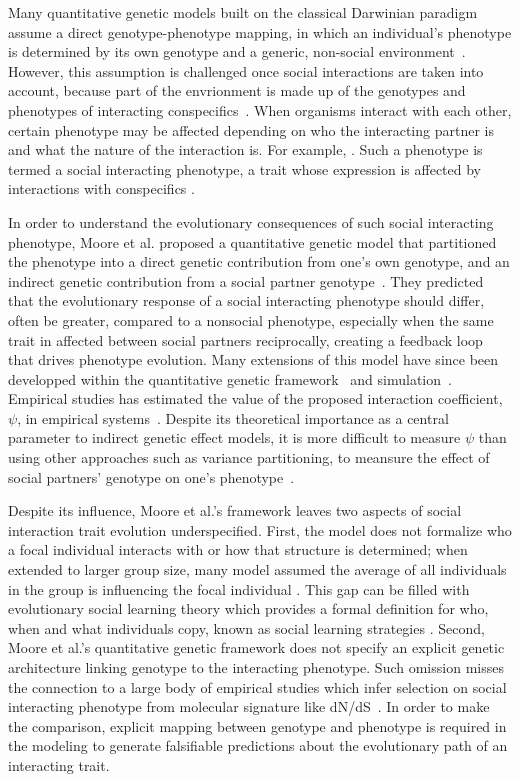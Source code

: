 \documentclass[9pt,twocolumn,twoside]{pnas-new}
\begin{document}
Many quantitative genetic models built on the classical Darwinian paradigm assume a direct genotype-phenotype mapping, in which an individual's phenotype is determined by its own genotype and a generic, non-social environment~\cite{Falconer1996}. However, this assumption is challenged once social interactions are taken into account, because part of the envrionment is made up of the genotypes and phenotypes of interacting conspecifics~\cite{Moore1997, Mousseau2009}. When organisms interact with each other, certain phenotype may be affected depending on who the interacting partner is and what the nature of the interaction is. For example, . Such a phenotype is termed a social interacting phenotype, a trait whose expression is affected by interactions with conspecifics \cite{Moore1997}.

In order to understand the evolutionary consequences of such social interacting phenotype, Moore et al. proposed a quantitative genetic model that partitioned the phenotype into a direct genetic contribution from one's own genotype, and an indirect genetic contribution from a social partner genotype~\cite{Moore1997}. They predicted that the evolutionary response of a social \Parasplit interacting phenotype should differ, often be greater, compared to a nonsocial phenotype, especially when the same trait in affected between social partners reciprocally, creating a feedback loop that drives phenotype evolution. Many extensions of this model have since been developped within the quantitative genetic framework~\cite{Wolf1999, McGlothlin2010, Bijma2008, agrawal2001, Bailey2014, Bailey2012} and simulation~\cite{Montiglio2017}. Empirical studies has estimated the value of the proposed interaction coefficient, $\psi$, in empirical systems~\cite{Bailey2017, Bijma2013}. Despite its theoretical importance as a central parameter to indirect genetic effect models, it is more difficult to measure $\psi$ than using other approaches such as variance partitioning, to meansure the effect of social partners' genotype on one's phenotype~\cite{Bailey2021}. 

Despite its influence, Moore et al.'s framework leaves two aspects of social interaction trait evolution underspecified. First, the model does not formalize who a focal individual interacts with or how that structure is determined; when extended to larger group size, many model assumed the average of all individuals in the group is influencing the focal individual \cite{McGlothlin2010}. This gap can be filled with evolutionary social learning theory which provides a formal definition for who, when and what individuals copy, known as social learning strategies \cite{Rogers1988,Laland2004,Rendell2010}. Second, Moore et al.'s quantitative genetic framework does not specify an explicit genetic architecture linking genotype to the interacting phenotype. Such omission misses the connection to a large body of empirical studies which infer selection on social interacting phenotype from molecular signature like dN/dS~\cite{Viljakainen2009, Roux2014, Harpur2013, Hunt2011, Warner2019}. In order to make the comparison, explicit mapping between genotype and phenotype is required in the modeling to generate falsifiable predictions about the evolutionary path of an interacting trait.
\end{document}
